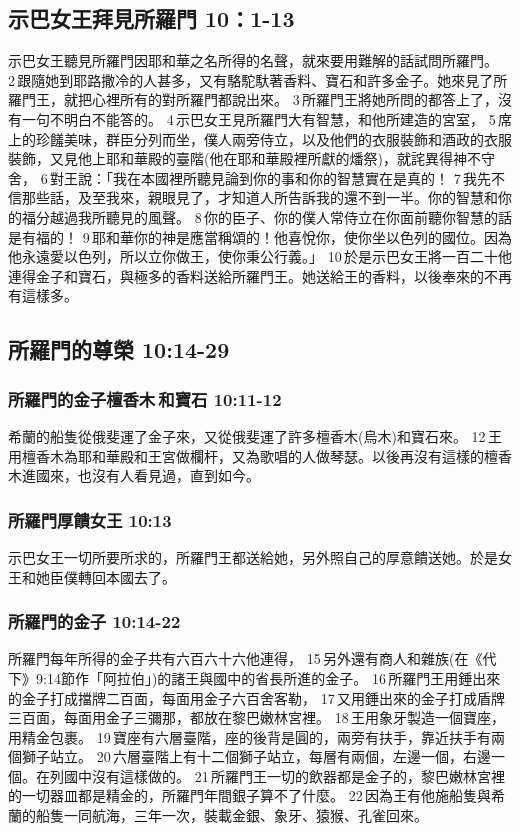 \subsection{示巴女王拜見所羅門 10：1-13 }
示巴女王聽見所羅門因耶和華之名所得的名聲，就來要用難解的話試問所羅門。 2 跟隨她到耶路撒冷的人甚多，又有駱駝馱著香料、寶石和許多金子。她來見了所羅門王，就把心裡所有的對所羅門都說出來。 3 所羅門王將她所問的都答上了，沒有一句不明白不能答的。 4 示巴女王見所羅門大有智慧，和他所建造的宮室， 5 席上的珍饈美味，群臣分列而坐，僕人兩旁侍立，以及他們的衣服裝飾和酒政的衣服裝飾，又見他上耶和華殿的臺階(他在耶和華殿裡所獻的燔祭)，就詫異得神不守舍， 6 對王說：「我在本國裡所聽見論到你的事和你的智慧實在是真的！ 7 我先不信那些話，及至我來，親眼見了，才知道人所告訴我的還不到一半。你的智慧和你的福分越過我所聽見的風聲。 8 你的臣子、你的僕人常侍立在你面前聽你智慧的話是有福的！ 9 耶和華你的神是應當稱頌的！他喜悅你，使你坐以色列的國位。因為他永遠愛以色列，所以立你做王，使你秉公行義。」 10 於是示巴女王將一百二十他連得金子和寶石，與極多的香料送給所羅門王。她送給王的香料，以後奉來的不再有這樣多。



\subsection{所羅門的尊榮 10:14-29}

\subsubsection{所羅門的金子檀香木 和寶石 10:11-12}
希蘭的船隻從俄斐運了金子來，又從俄斐運了許多檀香木(烏木)和寶石來。 12 王用檀香木為耶和華殿和王宮做欄杆，又為歌唱的人做琴瑟。以後再沒有這樣的檀香木進國來，也沒有人看見過，直到如今。

\subsubsection{所羅門厚饋女王 10:13}
示巴女王一切所要所求的，所羅門王都送給她，另外照自己的厚意饋送她。於是女王和她臣僕轉回本國去了。

\subsubsection{所羅門的金子 10:14-22}
所羅門每年所得的金子共有六百六十六他連得， 15 另外還有商人和雜族(在《代下》9:14節作「阿拉伯」)的諸王與國中的省長所進的金子。 16 所羅門王用錘出來的金子打成擋牌二百面，每面用金子六百舍客勒， 17 又用錘出來的金子打成盾牌三百面，每面用金子三彌那，都放在黎巴嫩林宮裡。 18 王用象牙製造一個寶座，用精金包裹。 19 寶座有六層臺階，座的後背是圓的，兩旁有扶手，靠近扶手有兩個獅子站立。 20 六層臺階上有十二個獅子站立，每層有兩個，左邊一個，右邊一個。在列國中沒有這樣做的。 21 所羅門王一切的飲器都是金子的，黎巴嫩林宮裡的一切器皿都是精金的，所羅門年間銀子算不了什麼。 22 因為王有他施船隻與希蘭的船隻一同航海，三年一次，裝載金銀、象牙、猿猴、孔雀回來。

